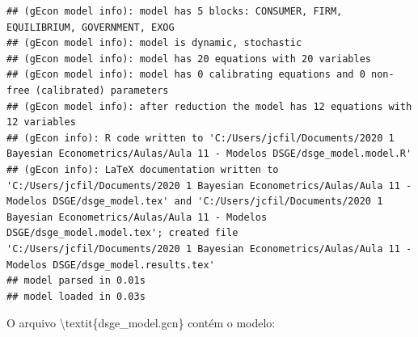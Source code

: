 \documentclass[12pt,a4paper,]{article}
\newcommand{\0}{\mathbf{0}}
\begin{document}
\begin{verbatim}
## (gEcon model info): model has 5 blocks: CONSUMER, FIRM, EQUILIBRIUM, GOVERNMENT, EXOG
## (gEcon model info): model is dynamic, stochastic
## (gEcon model info): model has 20 equations with 20 variables
## (gEcon model info): model has 0 calibrating equations and 0 non-free (calibrated) parameters
## (gEcon model info): after reduction the model has 12 equations with 12 variables
## (gEcon info): R code written to 'C:/Users/jcfil/Documents/2020 1 Bayesian Econometrics/Aulas/Aula 11 - Modelos DSGE/dsge_model.model.R'
## (gEcon info): LaTeX documentation written to 'C:/Users/jcfil/Documents/2020 1 Bayesian Econometrics/Aulas/Aula 11 - Modelos DSGE/dsge_model.tex' and 'C:/Users/jcfil/Documents/2020 1 Bayesian Econometrics/Aulas/Aula 11 - Modelos DSGE/dsge_model.model.tex'; created file 'C:/Users/jcfil/Documents/2020 1 Bayesian Econometrics/Aulas/Aula 11 - Modelos DSGE/dsge_model.results.tex'
## model parsed in 0.01s
## model loaded in 0.03s
\end{verbatim}

O arquivo \textbackslash{}textit\{dsge\_model.gcn\} contém o modelo:
\end{document}
